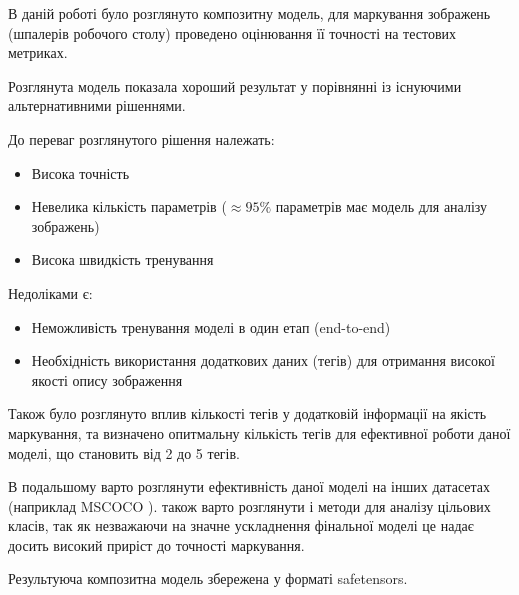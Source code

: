 \documentclass{udstu}
\begin{document}
В даній роботі було розглянуто композитну модель, для маркування зображень (шпалерів робочого столу)
проведено оцінювання її точності на тестових метриках.

Розглянута модель показала хороший результат у порівнянні із існуючими альтернативними рішеннями.

До переваг розглянутого рішення належать:

\begin{itemize}[+]
	\item Висока точність
	\item Невелика кількість параметрів ($\approx 95\%$ параметрів має модель для аналізу зображень)
	\item Висока швидкість тренування
\end{itemize}

Недоліками є:

\begin{itemize}[-]
	\item Неможливість тренування моделі в один етап (end-to-end)
	\item Необхідність використання додаткових даних (тегів) для
	отримання високої якості опису зображення
\end{itemize}

Також було розглянуто вплив кількості тегів у додатковій інформації на якість маркування, та визначено
опитмальну кількість тегів для ефективної роботи даної моделі, що становить від 2 до 5 тегів.

В подальшому варто розглянути ефективність даної моделі на інших датасетах (наприклад MSCOCO \cite{cocodataset}).
також варто розглянути і методи для аналізу цільових класів, так як незважаючи на
значне ускладнення фінальної моделі це надає досить високий приріст до точності маркування.

Результуюча композитна модель збережена у форматі safetensors.


\printbibliography




\inputminted{python}{../data.py}

\inputminted{python}{../models/utils.py}

\inputminted{python}{../models/vcnn.py}
\end{document}
